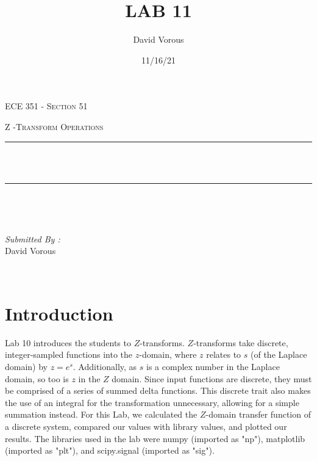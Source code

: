 \documentclass[12pt]{report}
\title{LAB 11}
\author{ David Vorous}
\date{11/16/21}
\makeatletter
\let\thetitle\@title
\makeatother
\begin{document}
\begin{titlepage}
	\centering
    \vspace*{0.5 cm}
\begin{center}    \textsc{\Large   ECE 351 - Section 51 }\\[2.0 cm]	\end{center}
	\textsc{\Large Z -Transform Operations }\\[0.5 cm]
	\rule{\linewidth}{0.2 mm} \\[0.4 cm]
	{ \huge \bfseries \thetitle}\\
	\rule{\linewidth}{0.2 mm} \\[1.5 cm]
	
	\begin{minipage}{0.4\textwidth}
		\begin{flushleft} \large
			\end{flushleft}
			\end{minipage}~
			\begin{minipage}{0.4\textwidth}
            
			\begin{flushright} \large
			\emph{Submitted By :} \\
			David Vorous  
		\end{flushright}
           
	\end{minipage}\\[2 cm]

\end{titlepage}


\tableofcontents

\pagebreak

\renewcommand{\thesection}{\arabic{section}}

\section{Introduction}
Lab 10 introduces the students to $Z$-transforms. $Z$-transforms take discrete, integer-sampled functions into the $z$-domain, where $z$ relates to $s$ (of the Laplace domain) by $z = e^{s}$. Additionally, as $s$ is a complex number in the Laplace domain, so too is $z$ in the $Z$ domain. Since input functions are discrete, they must be comprised of a series of summed delta functions. This discrete trait also makes the use of an integral for the transformation unnecessary, allowing for a simple summation instead. For this Lab, we calculated the $Z$-domain transfer function of a discrete system, compared our values with library values, and plotted our results. The libraries used in the lab were numpy (imported as "np"), matplotlib (imported as "plt"), and scipy.signal (imported as "sig").
\end{document}
